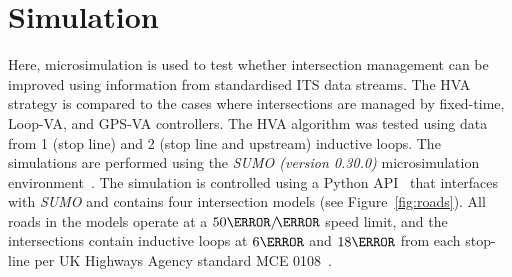 \documentclass[numbered]{trbunofficial}
\newcommand{\sidiv}{/\hspace{-1.5pt}} %
\begin{document}
\section{Simulation}\label{sec:sim}
Here, microsimulation is used to test whether intersection management can be improved using information from standardised ITS data streams. The HVA strategy is compared to the cases where intersections are managed by fixed-time, Loop-VA, and GPS-VA controllers. The HVA algorithm was tested using data from 1 (stop line) and 2 (stop line and upstream) inductive loops. The simulations are performed using the \emph{SUMO (version 0.30.0)} microsimulation environment~\cite{Krajzewicz2006}. The simulation is controlled using a Python API~\cite{python, traci1, box} that interfaces with \emph{SUMO} and contains four intersection models (see Figure~\ref{fig:roads}). All roads in the models operate at a $50\km\sidiv\hour$ speed limit, and the intersections contain inductive loops at $6\m$ and $18\m$ from each stop-line per UK Highways Agency standard MCE 0108~\cite{mce0108a}.
\end{document}
